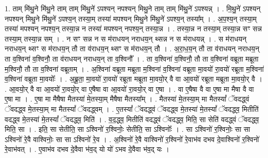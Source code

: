 \documentclass[17pt]{extarticle}
\begin{document}
1. ताम् मि॑थु॒ने मि॑थु॒ने ताम् ताम् मि॑थु॒ने॑ ऽपश्यन् नपश्यन् मिथु॒ने ताम् ताम् मि॑थु॒ने॑ ऽपश्यन्न् । . मि॒थु॒ने॑ ऽपश्यन् नपश्यन् मिथु॒ने मि॑थु॒ने॑ ऽपश्य॒न् तस्या॒म् तस्या॑ मपश्यन् मिथु॒ने मि॑थु॒ने॑ ऽपश्य॒न् तस्या᳚म् । . अ॒प॒श्य॒न् तस्या॒म् तस्या॑ मपश्यन् नपश्य॒न् तस्या॒न्न न तस्या॑ मपश्यन् नपश्य॒न् तस्या॒न्न । . तस्या॒न्न न तस्या॒म् तस्या॒न्न सꣳ सन्न तस्या॒म् तस्या॒न्न सम् । . न सꣳ सन्न न स म॑राधयन् नराधय॒न् थ्सन्न न स म॑राधयन्न् । . स म॑राधयन् नराधय॒न् थ्सꣳ स म॑राधय॒न् तौ ता व॑राधय॒न् थ्सꣳ स म॑राधय॒न् तौ । . अ॒रा॒ध॒य॒न् तौ ता व॑राधयन् नराधय॒न् ता व॒श्विना॑ व॒श्विनौ॒ ता व॑राधयन् नराधय॒न् ता व॒श्विनौ᳚ । . ता व॒श्विना॑ व॒श्विनौ॒ तौ ता व॒श्विना॑ वब्रूता मब्रूता म॒श्विनौ॒ तौ ता व॒श्विना॑ वब्रूताम् । . अ॒श्विना॑ वब्रूता मब्रूता म॒श्विना॑ व॒श्विना॑ वब्रूता मा॒वयो॑ रा॒वयो॑ रब्रूता म॒श्विना॑ व॒श्विना॑ वब्रूता मा॒वयोः᳚ । . अ॒ब्रू॒ता॒ मा॒वयो॑ रा॒वयो॑ रब्रूता मब्रूता मा॒वयो॒र् वै वा आ॒वयो॑ रब्रूता मब्रूता मा॒वयो॒र् वै । . आ॒वयो॒र् वै वा आ॒वयो॑ रा॒वयो॒र् वा ए॒षैषा वा आ॒वयो॑ रा॒वयो॒र् वा ए॒षा । . वा ए॒षैषा वै वा ए॒षा मा मैषा वै वा ए॒षा मा । . ए॒षा मा मैषैषा मैतस्या॑ मे॒तस्या॒म् मैषैषा मैतस्या᳚म् । . मैतस्या॑ मे॒तस्या॒म् मा मैतस्यां᳚ ॅवदद्ध्वं ॅवदद्ध्व मे॒तस्या॒म् मा मैतस्यां᳚ ॅवदद्ध्वम् । . ए॒तस्यां᳚ ॅवदद्ध्वं ॅवदद्ध्व मे॒तस्या॑ मे॒तस्यां᳚ ॅवदद्ध्व॒ मितीति॑ वदद्ध्व मे॒तस्या॑ मे॒तस्यां᳚ ॅवदद्ध्व॒ मिति॑ । . व॒द॒द्ध्व॒ मितीति॑ वदद्ध्वं ॅवदद्ध्व॒ मिति॒ सा सेति॑ वदद्ध्वं ॅवदद्ध्व॒ मिति॒ सा । . इति॒ सा सेतीति॒ सा ऽश्विनो॑ र॒श्विनोः॒ सेतीति॒ सा ऽश्विनोः᳚ । . सा ऽश्विनो॑ र॒श्विनोः॒ सा सा ऽश्विनो॑ रे॒वै वाश्विनोः॒ सा सा ऽश्विनो॑ रे॒व । . अ॒श्विनो॑ रे॒वै वाश्विनो॑ र॒श्विनो॑ रे॒वाभ॑व दभव दे॒वाश्विनो॑ र॒श्विनो॑ रे॒वाभ॑वत् । . ए॒वाभ॑व दभव दे॒वैवा भ॑व॒द् यो यो॑ ऽभव दे॒वैवा भ॑व॒द् यः । \newline
\end{document}
